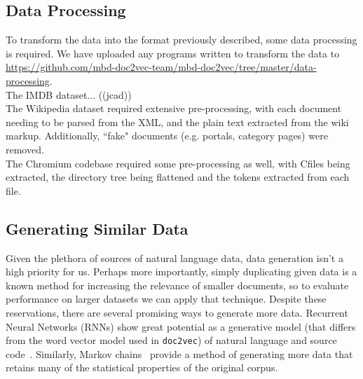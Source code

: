 \documentclass[11pt]{article}
\newcommand{\CPP}
{C\nolinebreak[4]\hspace{-.05em}\raisebox{.22ex}{\footnotesize\bf ++\ }}
\begin{document}
\subsection*{Data Processing}
  To transform the data into the format previously described, some data processing
  is required. We have uploaded any programs written to transform the data to
  \url{https://github.com/mbd-doc2vec-team/mbd-doc2vec/tree/master/data-processing}.\\
  The IMDB dataset... ((jcad))\\
  The Wikipedia dataset required extensive pre-processing, with each document
  needing to be parsed from the XML, and the plain text extracted from the wiki markup.
  Additionally, ``fake" documents (e.g. portals, category pages) were removed.\\
  The Chromium codebase required some pre-processing as well, with \CPP files being
  extracted, the directory tree being flattened and the tokens extracted from each file.
\subsection*{Generating Similar Data}
  Given the plethora of sources of natural language data, data generation isn't a high
  priority for us. Perhaps more importantly, simply duplicating given data is a known
  method for increasing the relevance of smaller documents, so to evaluate performance
  on larger datasets we can apply that technique. Despite these reservations, there are
  several promising ways to generate more data. Recurrent Neural Networks (RNNs) show
  great potential as a generative model (that differs from the word vector model used
  in \texttt{doc2vec}) of natural language and source code~\cite{rnn2015}. Similarly,
  Markov chains~\cite{gilks2005markov} provide a method of generating more data that
  retains many of the statistical properties of the original corpus.

\newpage
\printbibliography
\end{document}
